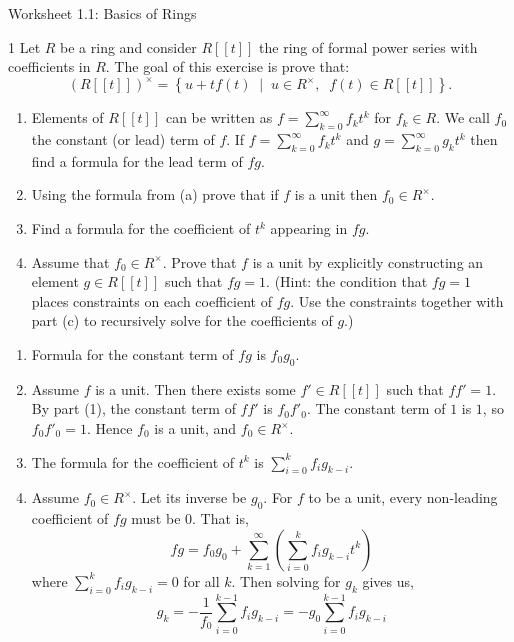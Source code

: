 \documentclass[Notebook.tex]{subfiles}
\begin{document}
\ifSubfilesClassLoaded{
    
}{}

\begin{center}
	{Worksheet 1.1: Basics of Rings}
\end{center}

\begin{problem}{1}
	 Let $R$ be a ring and consider $R[[t]]$ the ring of formal power series with coefficients in $R$. The goal of this exercise is prove that:
	 \[
	 \left(R[[t]]\right)^{\times} = \left\{ u + tf(t) \;\; \big| \;\; u \in R^{\times}, \;\; f(t) \in R[[t]] \right\}.
	 \]
    \begin{enumerate}[label=(\alph*),ref=\theenumi\alph*]
	 	\item Elements of $R[[t]]$ can be written as $f=\sum_{k=0}^{\infty} f_k t^k$ for $f_{k} \in R$. We call $f_0$ the constant (or lead) term of $f$. If $f=\sum_{k=0}^{\infty} f_k t^k$ and $g=\sum_{k=0}^{\infty} g_k t^k$ then find a formula for the lead term of $fg$. 
		\item Using the formula from (a) prove that if $f$ is a unit then $f_0 \in R^{\times}$. 
		\item Find a formula for the coefficient of $t^k$ appearing in $fg$. 
		\item Assume that $f_0 \in R^{\times}$. Prove that $f$ is a unit by explicitly constructing an element $g \in R[[t]]$ such that $fg = 1$. (Hint: the condition that $fg = 1$ places constraints on each coefficient of $fg$. Use the constraints together with part (c) to recursively solve for the coefficients of $g$.)	
    \end{enumerate}
\end{problem}

\begin{solution}
    \bbni 
    \begin{enumerate}[label=(\alph*),ref=\theenumi\alph*]
        \item Formula for the constant term of $fg$ is $f_0g_0$. 
        
        \item Assume $f$ is a unit. Then there exists some $f' \in R[[t]]$ such that $ff' = 1$.  By part (1), the constant term of $ff'$ is $f_0f'_0$. The constant term of $1$ is $1$, so $f_0f'_0 =1$. Hence $f_0$ is a unit, and $f_0 \in R^\times$.  
        
        \item The formula for the coefficient of $t^k$ is $\sum_{i=0}^kf_ig_{k-i}$.
        
        \item Assume $f_0 \in R^\times$. Let its inverse be $g_0$. For $f$ to be a unit, every non-leading coefficient of $fg$ must be $0$. That is, 
        \[fg = f_0g_0 + \sum_{k=1}^\infty\left(\sum_{i=0}^kf_ig_{k-i}t^k\right)\]
        where $\sum_{i=0}^kf_ig_{k-i} = 0$ for all $k$. Then solving for $g_k$ gives us, 
        \[g_k = -\frac{1}{f_0}\sum_{i=0}^{k-1}f_ig_{k-i} = -g_0\sum_{i=0}^{k-1}f_ig_{k-i}\]
    \end{enumerate}
\end{solution}
\end{document}
